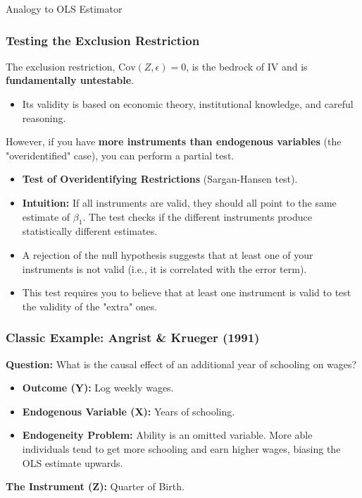 \documentclass[
  ignorenonframetext,
  aspectratio=169]{beamer}
\newcommand{\Cov}{\text{Cov}}
\begin{document}
\begin{frame}{Analogy to OLS Estimator}
\begin{frame}
\frametitle{Testing the Exclusion Restriction}
The exclusion restriction, $\Cov(Z, \epsilon)=0$, is the bedrock of IV and is \textbf{fundamentally untestable}.
\begin{itemize}
    \item Its validity is based on economic theory, institutional knowledge, and careful reasoning.
\end{itemize}
\pause
However, if you have \textbf{more instruments than endogenous variables} (the "overidentified" case), you can perform a partial test.
\begin{itemize}
    \item \textbf{Test of Overidentifying Restrictions} (Sargan-Hansen test).
    \item \textbf{Intuition:} If all instruments are valid, they should all point to the same estimate of $\beta_1$. The test checks if the different instruments produce statistically different estimates.
    \item A rejection of the null hypothesis suggests that at least one of your instruments is not valid (i.e., it is correlated with the error term).
    \item This test requires you to believe that at least one instrument is valid to test the validity of the "extra" ones.
\end{itemize}
\end{frame}

\begin{frame}
\frametitle{Classic Example: Angrist \& Krueger (1991)}
\textbf{Question:} What is the causal effect of an additional year of schooling on wages?
\begin{itemize}
    \item \textbf{Outcome (Y):} Log weekly wages.
    \item \textbf{Endogenous Variable (X):} Years of schooling.
    \item \textbf{Endogeneity Problem:} Ability is an omitted variable. More able individuals tend to get more schooling and earn higher wages, biasing the OLS estimate upwards.
\end{itemize}
\pause
\textbf{The Instrument (Z):} Quarter of Birth.
\end{frame}


\end{frame}
\end{document}
